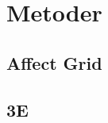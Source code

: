 \chapter{Metoder}\label{ch:met}
\section{Affect Grid}\label{sec:AG}
\cite{AffectGrid}

\section{3E}\label{sec:3E}


